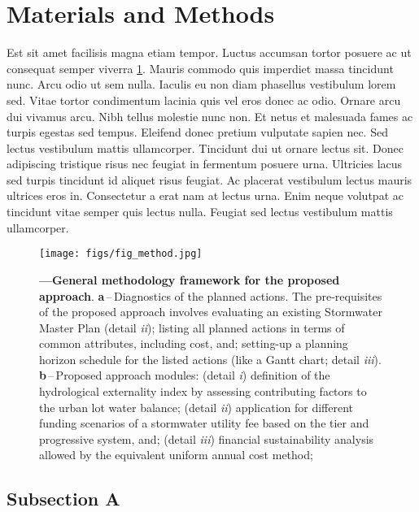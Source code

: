\documentclass[12pt]{article}
\begin{document}
\section{Materials and Methods} \label{sec:methods}

\par Est sit amet facilisis magna etiam tempor. Luctus accumsan tortor posuere ac ut consequat semper viverra \ref{fig:fig}. Mauris commodo quis imperdiet massa tincidunt nunc. Arcu odio ut sem nulla. Iaculis eu non diam phasellus vestibulum lorem sed. Vitae tortor condimentum lacinia quis vel eros donec ac odio. Ornare arcu dui vivamus arcu. Nibh tellus molestie nunc non. Et netus et malesuada fames ac turpis egestas sed tempus. Eleifend donec pretium vulputate sapien nec. Sed lectus vestibulum mattis ullamcorper. Tincidunt dui ut ornare lectus sit. Donec adipiscing tristique risus nec feugiat in fermentum posuere urna. Ultricies lacus sed turpis tincidunt id aliquet risus feugiat. Ac placerat vestibulum lectus mauris ultrices eros in. Consectetur a erat nam at lectus urna. Enim neque volutpat ac tincidunt vitae semper quis lectus nulla. Feugiat sed lectus vestibulum mattis ullamcorper.

\begin{figure}[t!] %
	\centering                                       
	\texttt{[image: figs/fig\_method.jpg]}    
	\caption[General methodology framework]
	{ \textbf{---\;General methodology framework for the proposed approach}.
		\textbf{a}\,--\,Diagnostics of the planned actions. The pre-requisites of the proposed approach involves evaluating an existing Stormwater Master Plan (detail \textrm{\textit{ii}}); listing all planned actions in terms of common attributes, including cost, and; setting-up a planning horizon schedule for the listed actions (like a Gantt chart; detail \textrm{\textit{iii}}).
		\textbf{b}\,--\,Proposed approach modules: (detail \textrm{\textit{i}}) definition of the hydrological externality index by assessing contributing factors to the urban lot water balance; (detail \textrm{\textit{ii}}) application for different funding scenarios of a stormwater utility fee based on the tier and progressive system, and; (detail \textrm{\textit{iii}}) financial sustainability analysis allowed by the equivalent uniform annual cost method;		
	}
	\label{fig:fig}  %
\end{figure}

\subsection{Subsection A} \label{sec:suba}
\end{document}
